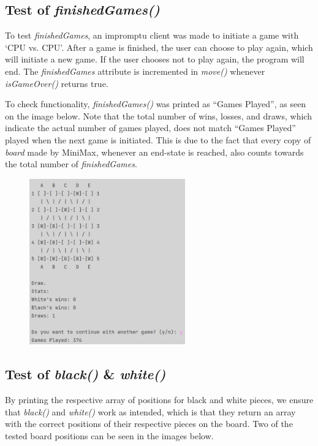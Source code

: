 \documentclass[12pt, a4paper]{article}
\begin{document}
\subsection{Test of \emph{finishedGames()}} \par
To test \emph{finishedGames}, an impromptu client was made to initiate a game with ‘CPU vs. CPU’. After a game is finished, the user can choose to play again, which will initiate a new game. If the user chooses not to play again, the program will end. The \emph{finishedGames} attribute is incremented in \emph{move()} whenever \emph{isGameOver()} returns true. \par To check functionality, \emph{finishedGames()} was printed as “Games Played”, as seen on the image below. 
Note that the total number of wins, losses, and draws, which indicate the actual number of games played, does not match “Games Played” played when the next game is initiated. This is due to the fact that every copy of \emph{board} made by MiniMax, whenever an end-state is reached, also counts towards the total number of \emph{finishedGames}.

\begin{figure}[h]
	\centering
	\includegraphics[width=0.6\textwidth]{TestAfFinishedGames.png}	
\end{figure}
\newpage
\subsection{Test of \emph{black()} \& \emph{white()}}
By printing the respective array of positions for black and white pieces, we ensure that \emph{black()} and \emph{white()} work as intended, which is that they return an array with the correct positions of their respective pieces on the board. Two of the tested board positions can be seen in the images below.
\end{document}
